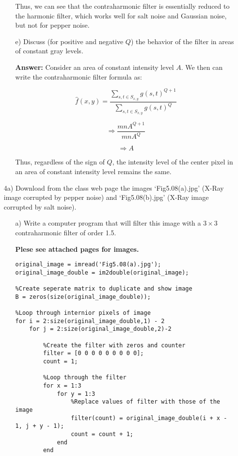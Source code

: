 \documentclass{article}
\begin{document}
\begin{enumerate}
\begin{enumerate}
Thus, we can see that the contraharmonic filter is essentially reduced to the harmonic filter, which works well for salt noise and Gaussian noise, but not for pepper noise.

\newpage
\item[e)] Discuss (for positive and negative $Q$) the behavior of the filter in areas of constant gray levels.

\textbf{Answer: }Consider an area of constant intensity level $A$. We then can write the contraharmonic filter formula as:

\begin{equation}
\hat f (x,y) = \frac{\sum_{s,t \in S_{x,y}}^{} g(s,t)^{Q+1}}{\sum_{s,t \in S_{x,y}}^{} g(s,t)^Q}
\end{equation}

\begin{equation}
\Rightarrow \frac{mnA^{Q+1}}{mnA^Q}
\end{equation}

$$\Rightarrow A$$

Thus, regardless of the sign of $Q$, the intensity level of the center pixel in an area of constant intensity level remains the same.
\end{enumerate}

\item[4a)] Download from the class web page the images `Fig5.08(a).jpg' (X-Ray image corrupted by pepper noise) and `Fig5.08(b).jpg' (X-Ray image corrupted by salt noise).

\begin{enumerate}
\item[a)] Write a computer program that will filter this image with a $3 \times 3$ contraharmonic filter of order 1.5. 

\textbf{Plese see attached pages for images.} 

\begin{lstlisting}
original_image = imread('Fig5.08(a).jpg');
original_image_double = im2double(original_image);

%Create seperate matrix to duplicate and show image
B = zeros(size(original_image_double));

%Loop through internior pixels of image
for i = 2:size(original_image_double,1) - 2
    for j = 2:size(original_image_double,2)-2
        
        %Create the filter with zeros and counter
        filter = [0 0 0 0 0 0 0 0 0];
        count = 1;
        
        %Loop through the filter
        for x = 1:3
            for y = 1:3
                %Replace values of filter with those of the image
                filter(count) = original_image_double(i + x - 1, j + y - 1);
                count = count + 1;
            end
        end
        

\end{lstlisting}
\end{enumerate}
\end{enumerate}
\end{document}
